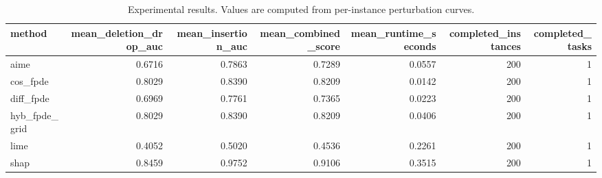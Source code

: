 \begin{table}[t]
\caption{Experimental results. Values are computed from per-instance perturbation curves.}
\label{tab:main_results_computed}
\centering
\begin{tabular}{lrrrrrr}
\toprule
method & mean\_deletion\_drop\_auc & mean\_insertion\_auc & mean\_combined\_score & mean\_runtime\_seconds & completed\_instances & completed\_tasks \\
\midrule
aime & 0.6716 & 0.7863 & 0.7289 & 0.0557 & 200 & 1 \\
cos\_fpde & 0.8029 & 0.8390 & 0.8209 & 0.0142 & 200 & 1 \\
diff\_fpde & 0.6969 & 0.7761 & 0.7365 & 0.0223 & 200 & 1 \\
hyb\_fpde\_grid & 0.8029 & 0.8390 & 0.8209 & 0.0406 & 200 & 1 \\
lime & 0.4052 & 0.5020 & 0.4536 & 0.2261 & 200 & 1 \\
shap & 0.8459 & 0.9752 & 0.9106 & 0.3515 & 200 & 1 \\
\bottomrule
\end{tabular}

\end{table}
